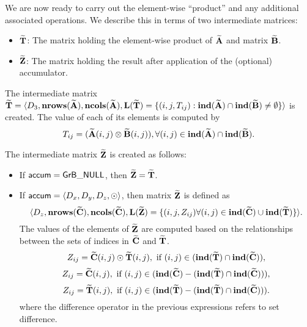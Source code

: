 We are now ready to carry out the element-wise ``product'' and any additional 
associated operations.  We describe this in terms of two intermediate matrices:
\begin{itemize}
	\item ${\bf \widetilde{T}}$: The matrix holding the element-wise product of
    ${\bf \widetilde{A}}$ and matrix ${\bf \widetilde{B}}$.
	\item ${\bf \widetilde{Z}}$: The matrix holding the result after 
    application of the (optional) accumulator.
\end{itemize}

The intermediate matrix ${\bf \widetilde{T}} = \langle
D_3, \bold{nrows}({\bf \widetilde{A}}), \bold{ncols}({\bf \widetilde{A}}),
\bold{L}({\bf \widetilde{T}}) =
\{(i,j,T_{ij}) : \bold{ind}({\bf \widetilde{A}}) \cap 
\bold{ind}({\bf \widetilde{B}})
 \neq \emptyset \} \rangle$
is created.  The value of each of its elements is computed by 
\[T_{ij} = ({\bf \widetilde{A}}(i,j)
\otimes {\bf \widetilde{B}}(i,j)), \forall (i,j) \in 
\bold{ind}({\bf \widetilde{A}}) \cap 
\bold{ind}({\bf \widetilde{B}}).\]

The intermediate matrix ${\bf \widetilde{Z}}$ is created as follows:
\begin{itemize}
    \item If ${\sf accum} = {\sf GrB\_NULL}$, then ${\bf \widetilde{Z}} = {\bf \widetilde{T}}$.

    \item If ${\sf accum} = \langle D_x, D_y, D_z, \odot \rangle$, then matrix ${\bf \widetilde{Z}}$ is defined as 
        \[ \langle D_z, \bold{nrows}({\bf \widetilde{C}}), \bold{ncols}({\bf \widetilde{C}}), \bold{L}({\bf \widetilde{Z}})
		= \{(i,j,Z_{ij})  \forall (i,j) \in \bold{ind}({\bf \widetilde{C}}) \cup 
        \bold{ind}({\bf \widetilde{T}}) \} \rangle.\]
    The values of the elements of ${\bf \widetilde{Z}}$ are computed based on the relationships between the sets of indices in ${\bf \widetilde{C}}$ and ${\bf \widetilde{T}}$.
\[
Z_{ij} = {\bf \widetilde{C}}(i,j) \odot {\bf \widetilde{T}}(i,j), \ \mbox{if}\  (i,j) \in  (\bold{ind}({\bf \widetilde{T}}) \cap \bold{ind}({\bf \widetilde{C}})),
\]
\[
Z_{ij} = \matrix{\widetilde{C}}(i,j), \ \mbox{if}\  (i,j) \in  (\bold{ind}(\matrix{\widetilde{C}}) - (\bold{ind}(\matrix{\widetilde{T}}) \cap \bold{ind}(\matrix{\widetilde{C}}))),
\]
\[
Z_{ij} = \matrix{\widetilde{T}}(i,j), \ \mbox{if}\  (i,j) \in  (\bold{ind}(\matrix{\widetilde{T}}) - (\bold{ind}(\matrix{\widetilde{T}}) \cap \bold{ind}(\matrix{\widetilde{C}}))).
\]
where the difference operator in the previous expressions refers to set difference.
\end{itemize}

